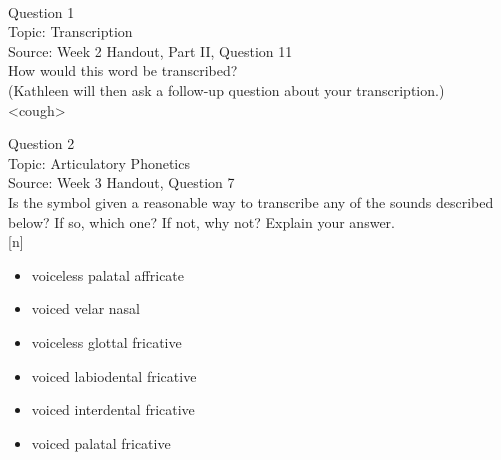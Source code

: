 \documentclass[12pt]{article}
\begin{document}
\newpage

\begin{center}
\textbf{{\color{red}{\HUGE END OF EXAM}}}\\

\end{center}
\newpage

\begin{center}
\textbf{{\color{blue}{\HUGE START OF EXAM\\}}}

\textbf{{\color{blue}{\HUGE Student ID: 12377\\}}}

\textbf{{\color{blue}{\HUGE \\}}}

\end{center}
\newpage

{\large Question 1}\\

Topic: Transcription\\
Source: Week 2 Handout, Part II, Question 11\\

How would this word be transcribed?\\ (Kathleen will then ask a follow-up question about your transcription.)\\

<cough>


\newpage

{\large Question 2}\\

Topic: Articulatory Phonetics\\
Source: Week 3 Handout, Question 7\\

Is the symbol given a reasonable way to transcribe any of the sounds described below? If so, which one? If not, why not? Explain your answer.\\

{[n]}

\begin{itemize} \item voiceless palatal affricate \item voiced velar nasal \item voiceless glottal fricative \item voiced labiodental fricative \item voiced interdental fricative \item voiced palatal fricative \end{itemize}
\end{document}
